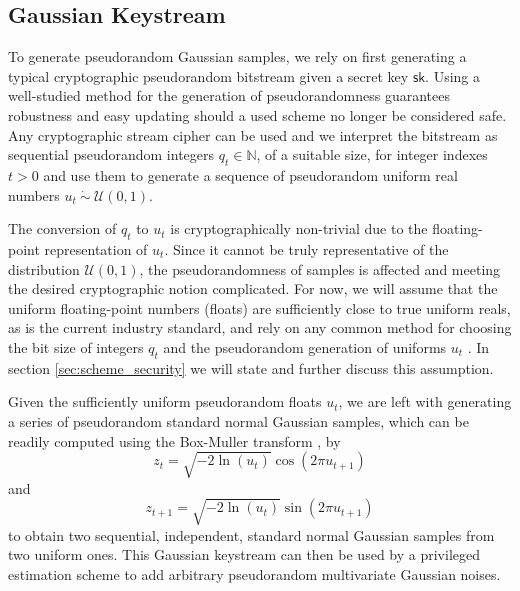 \documentclass[letterpaper, 10 pt, conference]{IEEEtran}
\theoremstyle{definition}
\begin{document}
\subsection{Gaussian Keystream}\label{subsec:gaussian_keystream}
To generate pseudorandom Gaussian samples, we rely on first generating a typical cryptographic pseudorandom bitstream given a secret key $\mathsf{sk}$. Using a well-studied method for the generation of pseudorandomness guarantees robustness and easy updating should a used scheme no longer be considered safe. Any cryptographic stream cipher can be used and we interpret the bitstream as sequential pseudorandom integers $q_t \in \mathbb{N}$, of a suitable size, for integer indexes $t>0$ and use them to generate a sequence of pseudorandom uniform real numbers $u_t\ \dot{\sim}\ \mathcal{U}(0,1)$.

The conversion of $q_t$ to $u_t$ is cryptographically non-trivial due to the floating-point representation of $u_t$. Since it cannot be truly representative of the distribution $\mathcal{U}(0,1)$, the pseudorandomness of samples is affected and meeting the desired cryptographic notion complicated. For now, we will assume that the uniform floating-point numbers (floats) are sufficiently close to true uniform reals, as is the current industry standard, and rely on any common method for choosing the bit size of integers $q_t$ and the pseudorandom generation of uniforms $u_t$ \cite{goualardGeneratingRandomFloatingPoint2020}. In section \ref{sec:scheme_security} we will state and further discuss this assumption.

Given the sufficiently uniform pseudorandom floats $u_t$, we are left with generating a series of pseudorandom standard normal Gaussian samples, which can be readily computed using the Box-Muller transform \cite{paleyFourierTransformsComplex1934}, by
\begin{equation}
   z_t = \sqrt{-2\ln (u_t)}\cos(2\pi u_{t+1})
\end{equation}
and
\begin{equation}
   z_{t+1} = \sqrt{-2\ln (u_t)}\sin(2\pi u_{t+1})
\end{equation}
to obtain two sequential, independent, standard normal Gaussian samples from two uniform ones. This Gaussian keystream can then be used by a privileged estimation scheme to add arbitrary pseudorandom multivariate Gaussian noises.

% 
% 
\end{document}

